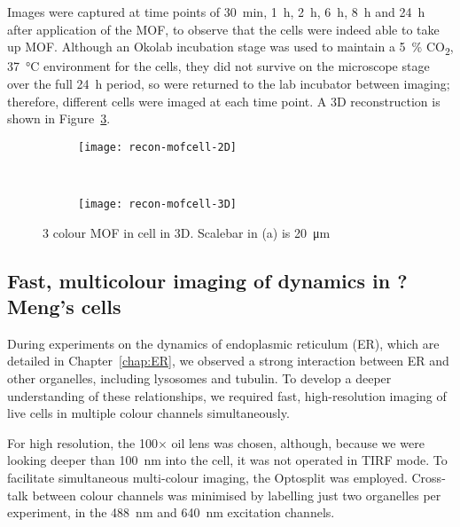 Images were captured at time points of \SI{30}{\minute}, \SI{1}{\hour}, \SI{2}{\hour}, \SI{6}{\hour}, \SI{8}{\hour} and \SI{24}{\hour} after application of the MOF, to observe that the cells were indeed able to take up MOF.
Although an Okolab incubation stage was used to maintain a \SI{5}{\percent} CO\textsubscript{2}, \SI{37}{\degreeCelsius} environment for the cells, they did not survive on the microscope stage over the full \SI{24}{\hour} period, so were returned to the lab incubator between imaging; therefore, different cells were imaged at each time point. 
A 3D reconstruction is shown in Figure~\ref{fig:recon-mofcell}. 

\begin{figure}[tbp!]
\centering
\begin{subfigure}[b]{0.7\textwidth}
	\texttt{[image: recon-mofcell-2D]}
	\caption{}\label{fig:recon-mofcell-2D}
\end{subfigure}

~\newline
\begin{subfigure}[b]{0.7\textwidth}
	\texttt{[image: recon-mofcell-3D]}
	\caption{}\label{fig:recon-mofcell-3D}
\end{subfigure}
\caption[LAG SIM: 3D reconstruction of ?? cell]{3 colour MOF in cell in 3D. Scalebar in (a) is \SI{20}{\micro\metre}}
\label{fig:recon-mofcell}
\end{figure}

\subsection{Fast, multicolour imaging of dynamics in ?Meng's cells}
During experiments on the dynamics of endoplasmic reticulum (ER), which are detailed in Chapter~\ref{chap:ER}, we observed a strong interaction between ER and other organelles, including lysosomes and tubulin. 
To develop a deeper understanding of these relationships, we required fast, high-resolution imaging of live cells in multiple colour channels simultaneously. 

For high resolution, the 100$\times$ oil lens was chosen, although, because we were looking deeper than \SI{100}{\nano\metre} into the cell, it was not operated in TIRF mode. 
To facilitate simultaneous multi-colour imaging, the Optosplit was employed. 
Cross-talk between colour channels was minimised by labelling just two organelles per experiment, in the \SI{488}{\nano\metre} and \SI{640}{\nano\metre} excitation channels. 

